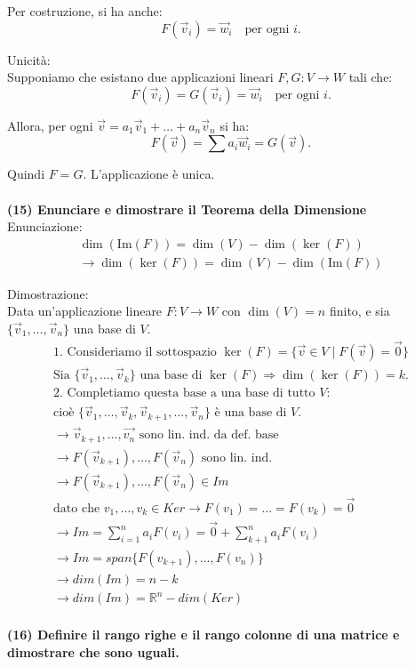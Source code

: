 \documentclass[10pt]{extarticle}
\begin{document}
Per costruzione, si ha anche:
\[
F(\vec{v}_i) = \vec{w}_i \quad \text{per ogni } i.
\]

Unicità: \\

Supponiamo che esistano due applicazioni lineari $F, G : V \to W$ tali che:
\[
F(\vec{v}_i) = G(\vec{v}_i) = \vec{w}_i \quad \text{per ogni } i.
\]

Allora, per ogni $\vec{v} = a_1 \vec{v}_1 + \dots + a_n \vec{v}_n$ si ha:
\[
F(\vec{v}) = \sum a_i \vec{w}_i = G(\vec{v}).
\]

Quindi $F = G$. L'applicazione è unica. \hfill \\
\vspace{1em} \\
\textbf{(15) Enunciare e dimostrare il Teorema della Dimensione}\\

Enunciazione:
\begin{align*}
    \dim(\text{Im}(F)) = \dim(V) - \dim(\ker(F)) \\
    \to \dim(\ker(F)) = \dim(V) - \dim(\text{Im}(F))
\end{align*}

Dimostrazione: \\
Data un'applicazione lineare $F : V \to W$ con $\dim(V) = n$ finito, e sia $\{ \vec{v}_1, \dots, \vec{v}_n \}$ una base di $V$. \\

\begin{align*}
    \text{1. Consideriamo il sottospazio } \ker(F) = \{ \vec{v} \in V \mid F(\vec{v}) = \vec{0} \} \\
    \text{Sia } \{ \vec{v}_1, \dots, \vec{v}_k \} \text{ una base di } \ker(F) \Rightarrow \dim(\ker(F)) = k. \\
    \text{2. Completiamo questa base a una base di tutto } V: \\
    \text{cioè } \{ \vec{v}_1, \dots, \vec{v}_k, \vec{v}_{k+1}, \dots, \vec{v}_n \} \text{ è una base di } V. \\
    \to \vec{v}_{k+1},\dots,\vec{v_n} \text{ sono lin. ind. da def. base} \\
    \to F(\vec{v}_{k+1}),\dots,F(\vec{v}_n) \text{ sono lin. ind. } \\
    \to F(\vec{v}_{k+1}),\dots,F(\vec{v}_n) \in Im \\
    \text{dato che } v_1,\dots,v_k \in Ker \to F(v_1)=\dots=F(v_k)=\vec{0} \\
    \to Im=\sum_{i=1}^n a_i F(v_i) = \vec{0} + \sum_{k+1}^n a_i F(v_i) \\
    \to Im=span\{F(v_{k+1}),\dots,F(v_n)\} \\
    \to dim(Im) = n - k \\
    \to dim(Im) = \mathbb{R}^n - dim(Ker)
\end{align*}
\hfill 
\vspace{1em} \\
\textbf{(16) Definire il rango righe e il rango colonne di una matrice e dimostrare che sono uguali.}\\
\end{document}
